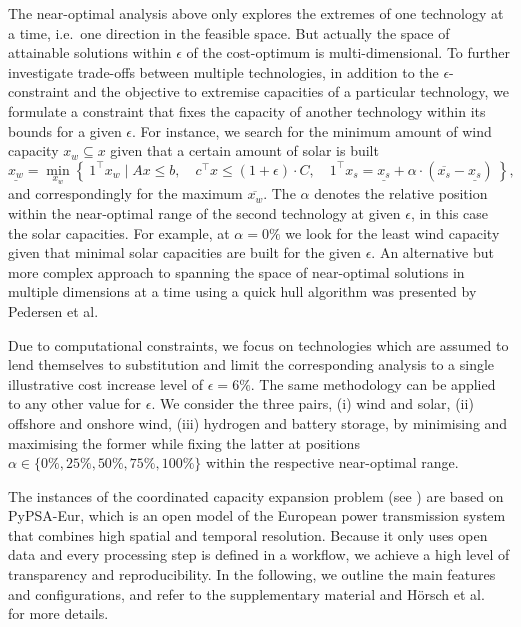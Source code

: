 The near-optimal analysis above only explores the extremes of one technology at
a time, i.e.~one direction in the feasible space. But actually the space of
attainable solutions within $\epsilon$ of the cost-optimum is multi-dimensional.
To further investigate trade-offs between multiple technologies, in addition to
the $\epsilon$-constraint and the objective to extremise capacities of a
particular technology, we formulate a constraint that fixes the capacity of
another technology within its bounds for a given $\epsilon$. For instance, we
search for the minimum amount of wind capacity $x_w \subseteq x$ given that a
certain amount of solar is built
\begin{equation}
    \label{eq:2D}
    \underline{x_w} = \min_{x_w}\left\{\:1^\top x_w \mid Ax\leq b,\quad c^\top x\leq (1+\epsilon)\cdot C, \quad 1^\top x_s = \underline{x_s} + \alpha \cdot (\overline{x_s}-\underline{x_s}) \:\right\},
\end{equation}
and correspondingly for the maximum $\overline{x_w}$. The $\alpha$ denotes the
relative position within the near-optimal range of the second technology at
given $\epsilon$, in this case the solar capacities. For example, at
$\alpha=0\%$ we look for the least wind capacity given that minimal solar
capacities are built for the given $\epsilon$. An alternative but more complex
approach to spanning the space of near-optimal solutions in multiple dimensions
at a time using a quick hull algorithm was presented by Pedersen et
al.~\cite{pedersen_modeling_2020}

Due to computational constraints, we focus on technologies which are assumed to
lend themselves to substitution and limit the corresponding analysis to a single
illustrative cost increase level of $\epsilon=6\%$. The same methodology can be
applied to any other value for $\epsilon$. We consider the three pairs, (i) wind
and solar, (ii) offshore and onshore wind, (iii) hydrogen and battery storage,
by minimising and maximising the former while fixing the latter at positions
$\alpha \in \{0\%,25\%,50\%,75\%,100\%\}$ within the respective near-optimal
range.



The instances of the coordinated capacity expansion problem (see
 ) are based on \mbox{PyPSA-Eur}, which is an open model
 of the European power transmission system that combines high spatial and
 temporal resolution.\cite{pypsaeur} Because it only uses open data and every
 processing step is defined in a workflow,\cite{snakemake} we achieve a high
 level of transparency and reproducibility. In the following, we outline the
 main features and configurations, and refer to the supplementary material and
 Hörsch et al.~\cite{pypsaeur} for more details.

